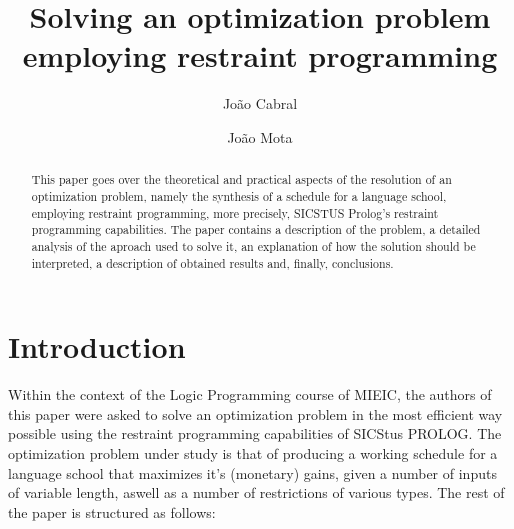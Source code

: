 \documentclass{llncs}
\begin{document}
\tableofcontents
%
\mainmatter              %
%
\title{Solving an optimization problem employing restraint programming}
%
%
\author{João Cabral \and João Mota}
%
%
%

\maketitle              %

\begin{abstract}
This paper goes over the theoretical and practical aspects of the resolution of an optimization problem,
namely the synthesis of a schedule for a language school, employing restraint programming, more precisely, 
SICSTUS Prolog's restraint programming capabilities.
The paper contains a description of the problem, a detailed analysis of the aproach used to solve it, 
an explanation of how the solution should be interpreted, a description of obtained results and, finally, conclusions.

\end{abstract}
%
\section{Introduction}
Within the context of the Logic Programming course of MIEIC, the authors of this paper were asked to solve an optimization problem in the most efficient way possible using the restraint programming capabilities of SICStus PROLOG. The optimization problem under study is that of producing a working schedule for a language school that maximizes it's (monetary) gains,  given a number of inputs of variable length, aswell as a number of restrictions of various types. The rest of the paper is structured as follows:
\end{document}
